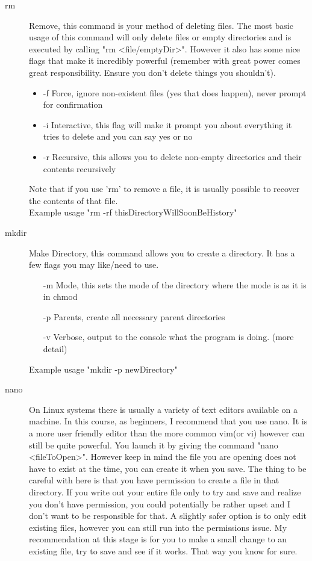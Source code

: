 \documentclass[a4paper,11pt]{report}
\begin{document}
\begin{description}
				\item[rm]
					Remove, this command is your method of deleting files. The most basic usage of this command will only delete files or empty directories and is executed by calling "rm <file/emptyDir>".
					However it also has some nice flags that make it incredibly powerful (remember with great power comes great responsibility. Ensure you don't delete things you shouldn't).
					\begin{itemize}
						\item{-f}
							Force, ignore non-existent files (yes that does happen), never prompt for confirmation
						\item{-i}
							Interactive, this flag will make it prompt you about everything it tries to delete and you can say yes or no
						\item{-r}
							Recursive, this allows you to delete non-empty directories and their contents recursively
					\end{itemize}

					Note that if you use 'rm' to remove a file, it is usually possible to recover the contents of that file.\\

					Example usage "rm -rf thisDirectoryWillSoonBeHistory"

					\item [mkdir]
					Make Directory, this command allows you to create a directory. It has a few flags you may like/need to use.
					\begin{itemize}
						\item[-m] Mode, this sets the mode of the directory where the mode is as it is in chmod
						\item[-p] Parents, create all necessary parent directories
						\item[-v] Verbose, output to the console what the program is doing. (more detail)
					\end{itemize}

					Example usage "mkdir -p newDirectory"

				\item[nano]
					On Linux systems there is usually a variety of text editors available on a machine. In this course, as beginners, I recommend that you use nano.
					It is a more user friendly editor than the more common vim(or vi) however can still be quite powerful.
					You launch it by giving the command "nano <fileToOpen>". However keep in mind the file you are opening does not have to exist at the time, you can create it when you save.
					The thing to be careful with here is that you have permission to create a file in that directory.
					If you write out your entire file only to try and save and realize you don't have permission, you could potentially be rather upset and I don't want to be responsible for that.
					A slightly safer option is to only edit existing files, however you can still run into the permissions issue. My recommendation at this stage is for you to make a small change to an existing file, try to save and see if it works. That way you know for sure.


\end{description}
\end{document}
